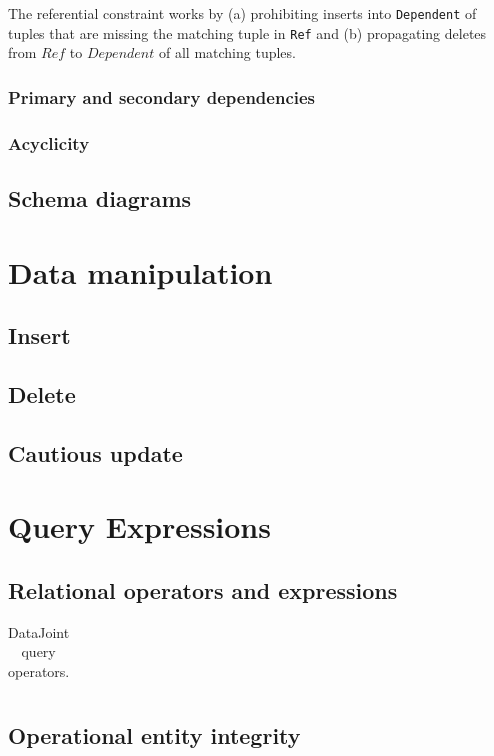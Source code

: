 \documentclass[letter,10pt]{article}
\begin{document}
The referential constraint works by (a) prohibiting inserts into \lstinline$Dependent$ of tuples that are missing the matching tuple in \lstinline$Ref$ and (b) propagating deletes from $Ref$ to $Dependent$ of all matching tuples.

\subsubsection{Primary and secondary dependencies}
\subsubsection{Acyclicity}

\subsection{Schema diagrams}\label{sec:diag}

\section{Data manipulation}\label{sec:manip}
\subsection{Insert}
\subsection{Delete}
\subsection{Cautious update}

\section{Query Expressions}\label{sec:query}
\subsection{Relational operators and expressions}
\begin{table}[ht]
\begin{tabu}{|X|}
\hline
\hline
\end{tabu}
\caption{DataJoint query operators.}
\label{tab:operators}
\end{table}

\subsection{Operational entity integrity}
\end{document}
